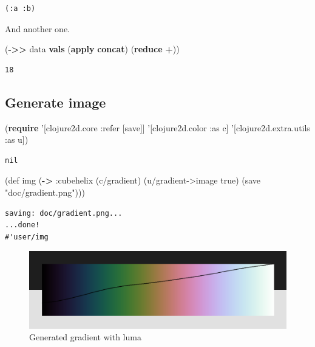 \documentclass[]{article}
\newenvironment{Shaded}{\begin{snugshade}}{\end{snugshade}}
\newcommand{\KeywordTok}[1]{\textcolor[rgb]{0.13,0.29,0.53}{\textbf{#1}}}
\newcommand{\StringTok}[1]{\textcolor[rgb]{0.31,0.60,0.02}{#1}}
\newcommand{\FunctionTok}[1]{\textcolor[rgb]{0.00,0.00,0.00}{#1}}
\newcommand{\VariableTok}[1]{\textcolor[rgb]{0.00,0.00,0.00}{#1}}
\newcommand{\BuiltInTok}[1]{#1}
\newcommand{\AttributeTok}[1]{\textcolor[rgb]{0.77,0.63,0.00}{#1}}
\newcommand{\NormalTok}[1]{#1}
\begin{document}
\begin{verbatim}
(:a :b)
\end{verbatim}

And another one.

\begin{Shaded}
\begin{Highlighting}[]
\NormalTok{(}\KeywordTok{->>}\NormalTok{ data}
     \KeywordTok{vals}
\NormalTok{     (}\KeywordTok{apply} \KeywordTok{concat}\NormalTok{)}
\NormalTok{     (}\KeywordTok{reduce} \KeywordTok{+}\NormalTok{))}
\end{Highlighting}
\end{Shaded}

\begin{verbatim}
18
\end{verbatim}

\subsection{Generate image}\label{generate-image}

\begin{Shaded}
\begin{Highlighting}[]
\NormalTok{(}\KeywordTok{require}\NormalTok{ '[clojure2d.core }\AttributeTok{:refer}\NormalTok{ [save]]}
\NormalTok{         '[clojure2d.color }\AttributeTok{:as}\NormalTok{ c]}
\NormalTok{         '[clojure2d.extra.utils }\AttributeTok{:as}\NormalTok{ u])}
\end{Highlighting}
\end{Shaded}

\begin{verbatim}
nil
\end{verbatim}

\begin{Shaded}
\begin{Highlighting}[]
\NormalTok{(}\BuiltInTok{def}\FunctionTok{ img }\NormalTok{(}\KeywordTok{->} \AttributeTok{:cubehelix}
\NormalTok{             (c/gradient)}
\NormalTok{             (u/gradient->image }\VariableTok{true}\NormalTok{)}
\NormalTok{             (save }\StringTok{"doc/gradient.png"}\NormalTok{)))}
\end{Highlighting}
\end{Shaded}

\begin{verbatim}
saving: doc/gradient.png...
...done!
#'user/img
\end{verbatim}

\begin{figure}
\centering
\includegraphics{gradient.png}
\caption{Generated gradient with luma}
\end{figure}
\end{document}
